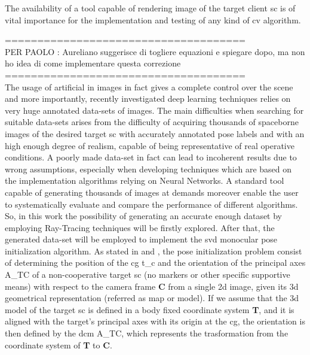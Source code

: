 The availability of a tool capable of rendering image of the target client \acrshort{sc} is of vital importance for the implementation and testing of any kind of \acrshort{cv} algorithm.


=====================================\\
PER PAOLO : Aureliano suggerisce di togliere equazioni e spiegare dopo, ma non ho idea di come implementare questa correzione\\
=====================================\\

The usage of artificial in images in fact gives a complete control over the scene and more importantly, recently investigated deep learning techniques relies on very huge annotated data-sets of images. The main difficulties when searching for suitable data-sets arises from the difficulty of acquiring thousands of spaceborne images of the desired target \acrshort{sc} with accurately annotated pose labels and with an high enough degree of realism, capable of being representative of real operative conditions. A poorly made data-set in fact can lead to incoherent results due to wrong assumptions, especially when developing techniques which are based on the implementation algorithms relying on Neural Networks. A standard tool capable of generating thousands of images at demands moreover enable the user to systematically evaluate and compare the performance of different algorithms.
So, in this work the possibility of generating an accurate enough dataset by employing Ray-Tracing techniques will be firstly explored. After that, the generated data-set will be employed to implement the \acrfull{svd} monocular pose initialization algorithm.
As stated in \cite{D2014} and \cite{Sharma2018}, the pose initialization problem consist of determining the position of the \acrfull{cg} \gls{t_c} and the orientation of the principal axes \gls{A_TC} of a non-cooperative target \acrshort{sc} (no markers or other specific supportive means) with respect to the camera frame \textbf{C} from a single \acrfull{2d} image, given its \acrfull{3d} geometrical representation (referred as map or model).
If we assume that the \acrshort{3d} model of the target \acrshort{sc} is defined in a body fixed coordinate system \textbf{T}, and it is aligned with the target's principal axes with its origin at the \acrshort{cg}, the orientation is then defined by the \acrfull{dcm} \gls{A_TC}, which represents the trasformation from the coordinate system of \textbf{T} to \textbf{C}.

